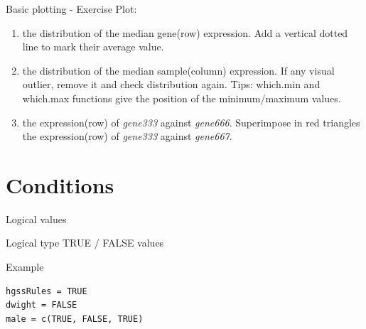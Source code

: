 \documentclass[10pt]{beamer}
\begin{document}





\begin{frame}{Basic plotting - Exercise}
  Plot:
  \begin{enumerate}
  \item the distribution of the median gene(row) expression. Add a vertical dotted line to mark their average value.
  \item the distribution of the median sample(column) expression. If any visual outlier, remove it and check distribution again.
    {\tiny Tips: {\sf which.min} and {\sf which.max} functions give the position of the minimum/maximum values.}
  \item the expression(row) of {\it gene333} against {\it gene666}. Superimpose in red triangles the expression(row) of {\it gene333} against {\it gene667}.
  \end{enumerate}
\end{frame}









\section{Conditions}

\begin{frame}[fragile]{Logical values}
  \begin{block}{Logical type}
    TRUE / FALSE values
  \end{block}
  \begin{exampleblock}{Example}
\begin{verbatim}
hgssRules = TRUE
dwight = FALSE
male = c(TRUE, FALSE, TRUE)
\end{verbatim}  
  \end{exampleblock}
\end{frame}
\end{document}
